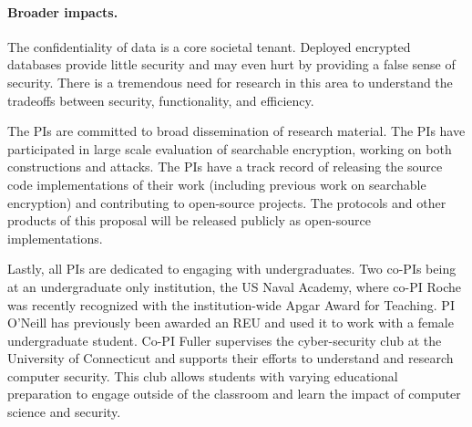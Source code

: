 \paragraph{Broader impacts.}
The confidentiality of data is a core societal tenant.  Deployed encrypted
databases provide little security and may even hurt by providing a false sense
of security.  There is a tremendous need for research in this area to
understand the tradeoffs between security, functionality, and efficiency.

The PIs are committed to broad dissemination of research material.  The PIs
have participated in large scale evaluation of searchable encryption, working
on both constructions and attacks. The PIs have a track record of
releasing the source code implementations of their work (including
previous work on searchable encryption) and contributing
to open-source projects.
The protocols and other products of this proposal will be released
publicly as open-source implementations.

Lastly, all PIs are
dedicated to engaging with undergraduates. Two co-PIs being at an undergraduate
only institution, the US Naval Academy, where co-PI Roche was recently
recognized with the institution-wide Apgar Award for Teaching. PI O'Neill has
previously been awarded an REU and used it to  work with a female undergraduate
student. Co-PI Fuller supervises the cyber-security club at the University of
Connecticut and supports their efforts to understand and research computer
security.  This club allows students with varying educational preparation to
engage outside of the classroom and learn the impact of computer science and
security. 



